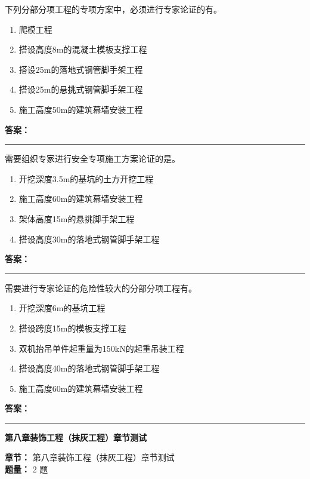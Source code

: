 \documentclass[UTF8,fontset=fandol,11pt]{ctexart}
\newcommand{\chaptertitle}[1]{\vspace{0.5em}\begin{tcolorbox}[enhanced,colback=deepblue,colframe=deepblue,arc=2mm,boxrule=0pt]\begin{center}\Large\bfseries\color{white}#1\end{center}\end{tcolorbox}\vspace{0.5em}}
\newcommand{\answerline}{\textcolor{answerred}{\rule{2.4cm}{0.7pt}}}
\begin{document}
\begin{quizbox}[title={第 8 题}]
下列分部分项工程的专项方案中，必须进行专家论证的有。\\
\begin{enumerate}[label=\Alph*.]
\item 爬模工程
\item 搭设高度8m的混凝土模板支撑工程
\item 搭设25m的落地式钢管脚手架工程
\item 搭设25m的悬挑式钢管脚手架工程
\item 施工高度50m的建筑幕墙安装工程
\end{enumerate}
\textbf{\textcolor{answerred}{答案：}} \answerline
\end{quizbox}

\begin{quizbox}[title={第 9 题}]
需要组织专家进行安全专项施工方案论证的是。\\
\begin{enumerate}[label=\Alph*.]
\item 开挖深度3.5m的基坑的土方开挖工程
\item 施工高度60m的建筑幕墙安装工程
\item 架体高度15m的悬挑脚手架工程
\item 搭设高度30m的落地式钢管脚手架工程
\end{enumerate}
\textbf{\textcolor{answerred}{答案：}} \answerline
\end{quizbox}

\begin{quizbox}[title={第 10 题}]
需要进行专家论证的危险性较大的分部分项工程有。\\
\begin{enumerate}[label=\Alph*.]
\item 开挖深度6m的基坑工程
\item 搭设跨度15m的模板支撑工程
\item 双机抬吊单件起重量为150kN的起重吊装工程
\item 搭设高度40m的落地式钢管脚手架工程
\item 施工高度60m的建筑幕墙安装工程
\end{enumerate}
\textbf{\textcolor{answerred}{答案：}} \answerline
\end{quizbox}

\chaptertitle{第八章装饰工程（抹灰工程）章节测试}
\begin{mainbox}
\textbf{\textcolor{mainblue}{章节：}} 第八章装饰工程（抹灰工程）章节测试\\
\textbf{\textcolor{answerred}{题量：}} 2 题
\end{mainbox}
\end{document}
